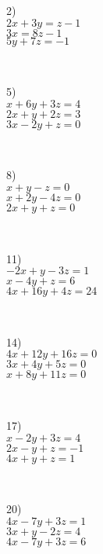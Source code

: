 \begin{multicols}{3}
  2)\\
  $2 x + 3 y = z - 1$\\
  $3 x = 8 z - 1$\\
  $5 y + 7 z = - 1$\par
~\par
  5)\\
  $x + 6 y + 3 z = 4$\\
  $2 x + y + 2 z = 3$\\
  $3 x - 2 y + z = 0$\par
~\par
  8)\\
  $x + y - z = 0$\\
  $x + 2 y - 4 z = 0$\\
  $2 x + y + z = 0$\par
~\par
  11)\\
  $- 2 x + y - 3 z = 1$\\
  $x - 4 y + z = 6$\\
  $4 x + 16 y + 4 z = 24$\par
~\par
  14)\\
  $4 x + 12 y + 16 z = 0$\\
  $3 x + 4 y + 5 z = 0$\\
  $x + 8 y + 11 z = 0$\par
~\par
  17)\\
  $x - 2 y + 3 z = 4$\\
  $2 x - y + z = - 1$\\
  $4 x + y + z = 1$\par
~\par
  20)\\
  $4 x - 7 y + 3 z = 1$\\
  $3 x + y - 2 z = 4$\\
  $4 x - 7 y + 3 z = 6$\par
~\par
  

\end{multicols}

